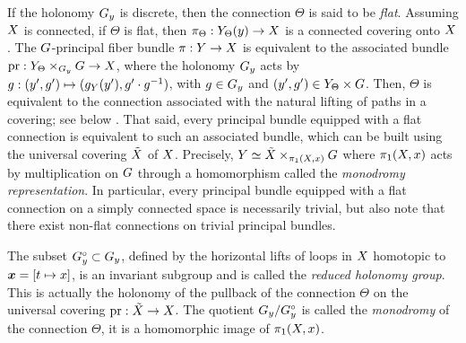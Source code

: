 \begin{article}
   If the holonomy $G_y$ is discrete,
  then the connection $\Theta$ is said to be {\em flat}.
  Assuming $X$ is connected,
  if $\Theta$ is flat,
  then $\pi_\Theta : Y_\Theta(y) \to X$ is a connected covering onto $X$.
  The $G$-principal fiber bundle $\pi : Y \to X$ is equivalent to the associated bundle $\mathrm{pr} : Y_\Theta \times_{G_y} G \to X$,
  where the holonomy $G_y$ acts by $g : (y',g') \mapsto (g_Y(y'), g'\cdot g^{-1})$,
  with $g \in G_y$ and $(y',g') \in Y_\Theta \times G$.
  Then,
  $\Theta$ is equivalent to the connection associated with the natural lifting of paths in a covering;
  see below .
  That said,
  every principal bundle equipped with a flat connection is equivalent to such an associated bundle,
  which can be built using the universal covering $\tilde {X}$ of $X$.
  Precisely,
  $Y \simeq \tilde {X} \times_{\pi_1(X,x)} G$ where $\pi_1(X,x)$ acts by multiplication on $G$ through a homomorphism called the {\em monodromy representation}.
  In particular,
  every principal bundle equipped with a flat connection on a simply connected space is necessarily trivial,
  but also note that there exist non-flat connections on trivial principal bundles.
  
   The subset $G_y^\circ \subset G_y$,
  defined by the horizontal lifts of loops in $X$ homotopic to ${\boldsymbol x} = [t \mapsto x]$,
  is an invariant subgroup and is called the {\em reduced holonomy group}.
  This is actually the holonomy of the pullback of the connection $\Theta$  on the universal covering $\mathrm{pr} : \tilde {X} \to X$.
  The quotient $G_y/G_y^\circ$ is called the {\em monodromy} of the connection $\Theta$,
  it is a homomorphic image of $\pi_1(X,x)$.
\end{article} %

